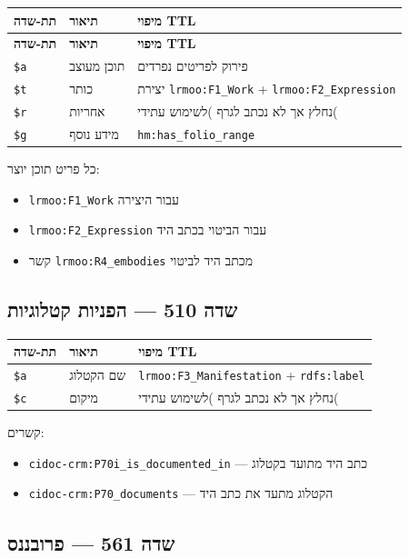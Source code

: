 \documentclass[12pt,a4paper]{article}
\newcommand{\marcfield}[1]{\texttt{#1}}
\newcommand{\ttlprop}[1]{\texttt{#1}}
\newcommand{\ttlclass}[1]{\texttt{#1}}
\begin{document}
\begin{longtable}{|L{2.5cm}|p{4.5cm}|L{9cm}|}
\hline
\textbf{תת-שדה} & \textbf{תיאור} & \textbf{מיפוי TTL} \\
\hline
\endfirsthead
\hline
\textbf{תת-שדה} & \textbf{תיאור} & \textbf{מיפוי TTL} \\
\hline
\endhead
\hline
\endfoot
\marcfield{\$a} & תוכן מעוצב & פירוק לפריטים נפרדים \\
\hline
\marcfield{\$t} & כותר & יצירת \ttlclass{lrmoo:F1\_Work} + \ttlclass{lrmoo:F2\_Expression} \\
\hline
\marcfield{\$r} & אחריות & נחלץ אך לא נכתב לגרף )לשימוש עתידי( \\
\hline
\marcfield{\$g} & מידע נוסף & \ttlprop{hm:has\_folio\_range} \\
\hline
\end{longtable}

כל פריט תוכן יוצר:
\begin{itemize}
\item \ttlclass{lrmoo:F1\_Work} עבור היצירה
\item \ttlclass{lrmoo:F2\_Expression} עבור הביטוי בכתב היד
\item קשר \ttlprop{lrmoo:R4\_embodies} מכתב היד לביטוי
\end{itemize}

\subsection{שדה 510 — הפניות קטלוגיות}

\begin{longtable}{|L{2.5cm}|p{4.5cm}|L{9cm}|}
\hline
\textbf{תת-שדה} & \textbf{תיאור} & \textbf{מיפוי TTL} \\
\hline
\marcfield{\$a} & שם הקטלוג & \ttlclass{lrmoo:F3\_Manifestation} + \ttlprop{rdfs:label} \\
\hline
\marcfield{\$c} & מיקום & נחלץ אך לא נכתב לגרף )לשימוש עתידי( \\
\hline
\end{longtable}

קשרים:
\begin{itemize}
\item \ttlprop{cidoc-crm:P70i\_is\_documented\_in} — כתב היד מתועד בקטלוג
\item \ttlprop{cidoc-crm:P70\_documents} — הקטלוג מתעד את כתב היד
\end{itemize}

\subsection{שדה 561 — פרובננס}
\end{document}
